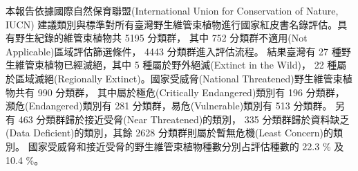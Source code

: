 \noindent 本報告依據國際自然保育聯盟(International Union for Conservation of Nature, IUCN)
建議類別與標準對所有臺灣野生維管束植物進行國家紅皮書名錄評估。具有野生紀錄的維管束植物共 5195 分類群，
其中 752 分類群不適用(Not Applicable)區域評估篩選條件， 4443 分類群進入評估流程。
結果臺灣有 27 種野生維管束植物已經滅絕，其中 5 種屬於野外絕滅(Extinct in the Wild)，
22 種屬於區域滅絕(Regionally Extinct)。國家受威脅(National Threatened)野生維管束植物共有 990 分類群，
其中屬於極危(Critically Endangered)類別有 196 分類群，
瀕危(Endangered)類別有 281 分類群，易危(Vulnerable)類別有 513 分類群。
另有 463 分類群歸於接近受脅(Near Threatened)的類別，
335 分類群歸於資料缺乏(Data Deficient)的類別，其餘 2628 分類群則屬於暫無危機(Least Concern)的類別。
國家受威脅和接近受脅的野生維管束植物種數分別占評估種數的 22.3 \% 及 10.4 \%。 
